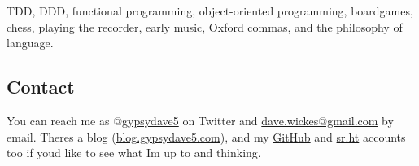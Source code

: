 TDD, DDD, functional programming, object-oriented programming,
boardgames, chess, playing the recorder, early music, Oxford commas, and
the philosophy of language.

\hypertarget{contact}{%
\subsection{Contact}\label{contact}}

You can reach me as @\href{https://twitter.com/gypsydave5}{gypsydave5}
on Twitter and \href{mailto:dave@gypsydave5.com}{dave.wickes@gmail.com}
by email. There\textquotesingle s a blog
(\href{http://blog.gypsydave5.com/}{blog.gypsydave5.com}), and my
\href{https://github.com/gypsydave5}{GitHub} and
\href{https://git.sr.ht/~dew/}{sr.ht} accounts too if
you\textquotesingle d like to see what I\textquotesingle m up to and
thinking.
